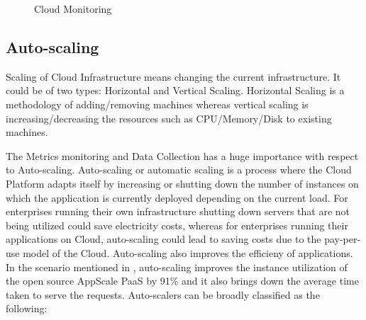 \documentclass[article,type=msc,colorback,12pt,accentcolor=tud7b,table]{tudthesis}
\begin{document}
\begin{figure}
 \begin{center}
  \makebox[\textwidth]{\texttt{[image: B5]}}
\end{center}
\caption{Cloud Monitoring \cite{aceto2013cloud}}
\end{figure}	
	
	\subsection{Auto-scaling}	
	
	Scaling of Cloud Infrastructure means changing the current infrastructure. It could be of two types: Horizontal and Vertical Scaling. Horizontal Scaling is a methodology of adding/removing machines whereas vertical scaling is increasing/decreasing the resources such as CPU/Memory/Disk to existing machines.
	
	The Metrics monitoring and Data Collection has a huge importance with respect to Auto-scaling. Auto-scaling or automatic scaling is a process where the Cloud Platform adapts itself by increasing or shutting down the number of instances on which the application is currently deployed depending on the current load. For enterprises running their own infrastructure shutting down servers that are not being utilized could save electricity costs, whereas for enterprises running their applications on Cloud, auto-scaling could lead to saving costs due to the pay-per-use model of the Cloud. Auto-scaling also improves the efficieny of applications. In the scenario mentioned in \cite{bunch2012pluggable}, auto-scaling improves the instance utilization of the open source AppScale PaaS by 91\% and it also brings down the average time taken to serve the requests. Auto-scalers can be broadly classified as the following: 
	
\end{document}
